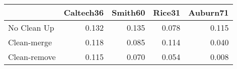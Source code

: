 \begin{tabular}{lrrrr}
\toprule
{} & Caltech36 & Smith60 & Rice31 & Auburn71 \\
\midrule
No Clean Up  &     0.132 &   0.135 &  0.078 &    0.115 \\
Clean-merge  &     0.118 &   0.085 &  0.114 &    0.040 \\
Clean-remove &     0.115 &   0.070 &  0.054 &    0.008 \\
\bottomrule
\end{tabular}
